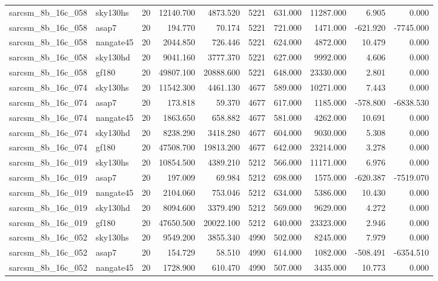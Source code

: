 \begin{longtable}{llrrrrrrrr}
sarcsm\_8b\_16c\_058 & sky130hs & 20 & 12140.700 & 4873.520 & 5221 & 631.000 & 11287.000 & 6.905 & 0.000 \\
sarcsm\_8b\_16c\_058 & asap7 & 20 & 194.770 & 70.174 & 5221 & 721.000 & 1471.000 & -621.920 & -7745.000 \\
sarcsm\_8b\_16c\_058 & nangate45 & 20 & 2044.850 & 726.446 & 5221 & 624.000 & 4872.000 & 10.479 & 0.000 \\
sarcsm\_8b\_16c\_058 & sky130hd & 20 & 9041.160 & 3777.370 & 5221 & 627.000 & 9992.000 & 4.606 & 0.000 \\
sarcsm\_8b\_16c\_058 & gf180 & 20 & 49807.100 & 20888.600 & 5221 & 648.000 & 23330.000 & 2.801 & 0.000 \\
sarcsm\_8b\_16c\_074 & sky130hs & 20 & 11542.300 & 4461.130 & 4677 & 589.000 & 10271.000 & 7.443 & 0.000 \\
sarcsm\_8b\_16c\_074 & asap7 & 20 & 173.818 & 59.370 & 4677 & 617.000 & 1185.000 & -578.800 & -6838.530 \\
sarcsm\_8b\_16c\_074 & nangate45 & 20 & 1863.650 & 658.882 & 4677 & 581.000 & 4262.000 & 10.691 & 0.000 \\
sarcsm\_8b\_16c\_074 & sky130hd & 20 & 8238.290 & 3418.280 & 4677 & 604.000 & 9030.000 & 5.308 & 0.000 \\
sarcsm\_8b\_16c\_074 & gf180 & 20 & 47508.700 & 19813.200 & 4677 & 642.000 & 23214.000 & 3.278 & 0.000 \\
sarcsm\_8b\_16c\_019 & sky130hs & 20 & 10854.500 & 4389.210 & 5212 & 566.000 & 11171.000 & 6.976 & 0.000 \\
sarcsm\_8b\_16c\_019 & asap7 & 20 & 197.009 & 69.984 & 5212 & 698.000 & 1575.000 & -620.387 & -7519.070 \\
sarcsm\_8b\_16c\_019 & nangate45 & 20 & 2104.060 & 753.046 & 5212 & 634.000 & 5386.000 & 10.430 & 0.000 \\
sarcsm\_8b\_16c\_019 & sky130hd & 20 & 8094.600 & 3379.490 & 5212 & 569.000 & 9629.000 & 4.272 & 0.000 \\
sarcsm\_8b\_16c\_019 & gf180 & 20 & 47650.500 & 20022.100 & 5212 & 640.000 & 23323.000 & 2.946 & 0.000 \\
sarcsm\_8b\_16c\_052 & sky130hs & 20 & 9549.200 & 3855.340 & 4990 & 502.000 & 8245.000 & 7.979 & 0.000 \\
sarcsm\_8b\_16c\_052 & asap7 & 20 & 154.729 & 58.510 & 4990 & 614.000 & 1082.000 & -508.491 & -6354.510 \\
sarcsm\_8b\_16c\_052 & nangate45 & 20 & 1728.900 & 610.470 & 4990 & 507.000 & 3435.000 & 10.773 & 0.000 \\

\end{longtable}
